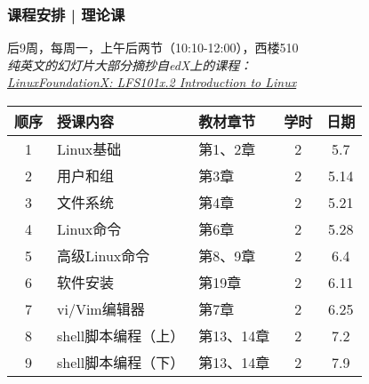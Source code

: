 \begin{frame}
  \frametitle{课程安排 | 理论课}
  \begin{center}
  \alert{后9周，每周一，上午后两节（10:10-12:00），西楼510}\\
  \vspace{0.2cm}
  {\footnotesize
  \textit{纯英文的幻灯片大部分摘抄自edX上的课程：\\ \href{https://www.edx.org/course/introduction-linux-linuxfoundationx-lfs101x-2}{LinuxFoundationX: LFS101x.2 Introduction to Linux}}
  }
  \end{center}
  \vspace{-0.5cm}
  \begin{table}
    \centering
    \begin{tabular}{cllcc}
      \hline
      \rowcolor{blue!50}顺序 & 授课内容 & 教材章节 & 学时 & 日期\\
      \hline
      1 & Linux基础 & 第1、2章 & 2 & 5.7\\
      2 & 用户和组 & 第3章 & 2 & 5.14\\
      3 & 文件系统 & 第4章 & 2 & 5.21\\
      4 & Linux命令 & 第6章 & 2 & 5.28\\
      5 & 高级Linux命令 & 第8、9章 & 2 & 6.4\\
      6 & 软件安装 & 第19章 & 2 & 6.11\\
      7 & vi/Vim编辑器 & 第7章 & 2 & 6.25\\
      8 & shell脚本编程（上） & 第13、14章 & 2 & 7.2\\
      9 & shell脚本编程（下） & 第13、14章 & 2 & 7.9\\
      \hline
    \end{tabular}
  \end{table}
\end{frame}

